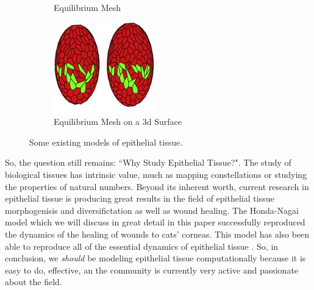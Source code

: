 \begin{figure}[h]
\begin{subfigure}[b]{0.4\textwidth}
        \caption{Equilibrium Mesh\cite{HondaNagai}}
        \label{fig:Honda}
    \end{subfigure}
    \hfill
    \begin{subfigure}[b]{0.4\textwidth}
        \centering
        \includegraphics[width=\textwidth]{../diagrams/mirim.png}
        \caption{Equilibrium Mesh on a 3d Surface \cite{Vertex Models}}
        \label{fig:mirim}
    \end{subfigure}
    \caption{Some existing models of epithelial tissue.}
    \label{fig:four graphs}
\end{figure}


So, the question still remains: ``Why Study Epithelial Tissue?". The study of biological tissues has intrinsic value, much as mapping constellations or studying the properties of natural numbers. Beyond its inherent worth, current research in epithelial tissue is producing great results in the field of epithelial tissue  morphogenisis and diversifictation as well as wound healing. The Honda-Nagai model which we will discuss in great detail in this paper successfully reproduced the dynamics of the healing of wounds to cats' corneas\cite{Wound Healing}. This model has also been able to reproduce all of the essential dynamics of epithelial tissue \cite{HondaNagai}. So, in conclusion, we \emph{should} be modeling epithelial tissue computationally because it is easy to do, effective, an the community is currently very active and passionate about the field. 